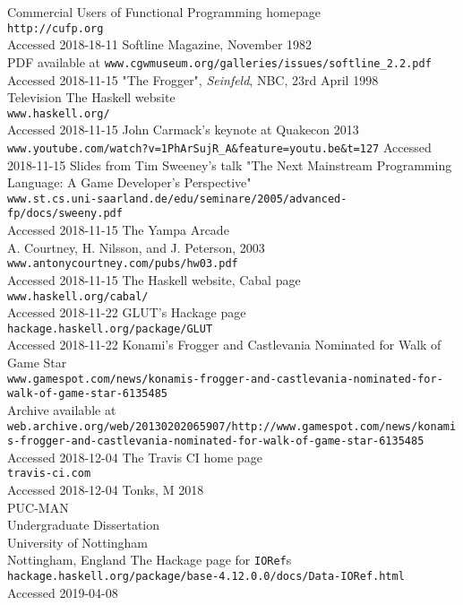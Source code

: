 \documentclass[12pt, a4paper]{report}
\begin{document}
\begin{thebibliography}{0}
    Commercial Users of Functional Programming homepage\\
    \verb|http://cufp.org|\\
    Accessed 2018-18-11
    Softline Magazine, November 1982\\
    PDF available at \verb|www.cgwmuseum.org/galleries/issues/softline_2.2.pdf|\\
    Accessed 2018-11-15
    "The Frogger", \textit{Seinfeld}, NBC, 23rd April 1998\\
    Television
    The Haskell website\\
    \verb|www.haskell.org/|\\
    Accessed 2018-11-15
    John Carmack's keynote at Quakecon 2013\\
    \verb|www.youtube.com/watch?v=1PhArSujR_A&feature=youtu.be&t=127|
    Accessed 2018-11-15
    Slides from Tim Sweeney's talk "The Next Mainstream Programming Language: A Game Developer’s Perspective"\\
    \verb|www.st.cs.uni-saarland.de/edu/seminare/2005/advanced-fp/docs/sweeny.pdf|\\
    Accessed 2018-11-15
    The Yampa Arcade\\
    A. Courtney, H. Nilsson, and J. Peterson, 2003\\
    \verb|www.antonycourtney.com/pubs/hw03.pdf|\\
    Accessed 2018-11-15
    The Haskell website, Cabal page\\
    \verb|www.haskell.org/cabal/|\\
    Accessed 2018-11-22
    GLUT's Hackage page\\
    \verb|hackage.haskell.org/package/GLUT|\\
    Accessed 2018-11-22
    Konami's Frogger and Castlevania Nominated for Walk of Game Star\\
    \verb|www.gamespot.com/news/konamis-frogger-and-castlevania-nominated-for-walk-of-game-star-6135485|\\
    Archive available at \verb|web.archive.org/web/20130202065907/http://www.gamespot.com/news/konamis-frogger-and-castlevania-nominated-for-walk-of-game-star-6135485|\\
    Accessed 2018-12-04
    The Travis CI home page\\
    \verb|travis-ci.com|\\
    Accessed 2018-12-04
    Tonks, M 2018\\
    PUC-MAN\\
    Undergraduate Dissertation\\
    University of Nottingham\\
    Nottingham, England
    The Hackage page for \verb|IORef|s\\
    \verb|hackage.haskell.org/package/base-4.12.0.0/docs/Data-IORef.html|\\
    Accessed 2019-04-08
\end{thebibliography}
\end{document}
